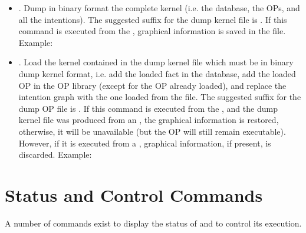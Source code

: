 \begin{itemize}

\item {}.  Dump in binary format the complete
kernel (i.e. the database, the OPs, and all the intentions). The suggested
suffix for the dump kernel file is . If this command is executed 
from the \XPK{}, graphical information is saved in the file.\*
Example: 

\item {}.  Load the kernel contained
in the dump kernel file which must be in binary dump kernel format, i.e. add
the loaded fact in the database, add the loaded OP in the OP library (except
for the OP already loaded), and replace the intention graph with the one loaded
from the file. The suggested suffix for the dump OP file is .  If
this command is executed from the \XPK{}, and the dump kernel file was produced
from an \XPK{}, the graphical information is restored, otherwise, it will be
unavailable (but the OP will still remain executable).  However, if it is
executed from a \CPK{}, graphical information, if present, is discarded. \*
Example: 

\end{itemize}

\section{\CPK{} Status and Control Commands}

A number of commands exist to display the status of \CPK{} and to control
its execution.

